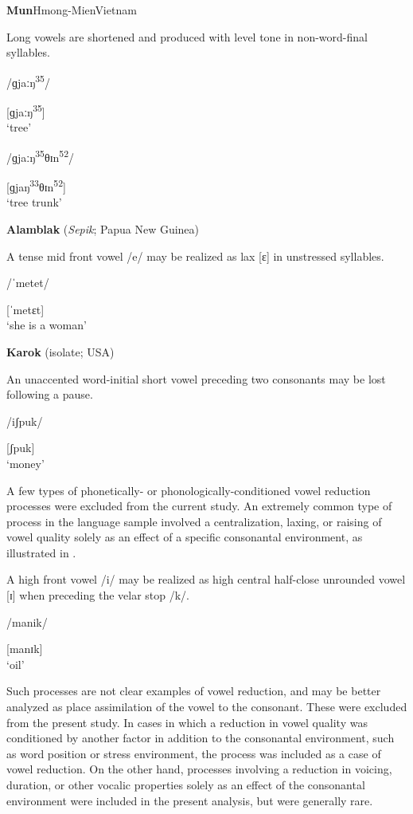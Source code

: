 \ea\label{ex:6.7}
 \textbf{Mun}{Hmong-Mien}{Vietnam}

Long vowels are shortened and produced with level tone in non-word-final syllables. 

\ea  /ɡjaːŋ\textsuperscript{35}/

[ɡjaːŋ\textsuperscript{35}]\\
\glt ‘tree’

\ex  /ɡjaːŋ\textsuperscript{35}θɪn\textsuperscript{52}/

[ɡjaŋ\textsuperscript{33}θɪn\textsuperscript{52}]\\
\glt ‘tree trunk’
\citep[117]{Clark2008}
\z
\z

\ea\label{ex:6.8}
  \textbf{Alamblak} (\textit{Sepik}; Papua New Guinea)

A tense mid front vowel /e/ may be realized as lax [ɛ] in unstressed syllables.

/ˈmetet/

[ˈmetɛt]\\
\glt ‘she is a woman’
\citep[38]{Bruce1984}
\z

\ea\label{ex:6.9}
   \textbf{Karok} (isolate; USA)

An unaccented word-initial short vowel preceding two consonants may be lost following a pause. 

/iʃpuk/

[ʃpuk]\\
\glt ‘money’
\citep[53]{Bright1957}
\z

  A few types of phonetically- or phonologically-conditioned vowel reduction processes were excluded from the current study. An extremely common type of process in the language sample involved a centralization, laxing, or raising of vowel quality solely as an effect of a specific consonantal environment, as illustrated in .

\ea\label{ex:6.10}

A high front vowel /i/ may be realized as high central half-close unrounded vowel [ɪ] when preceding the velar stop /k/.

/manik/

[manɪk]\\
\glt ‘oil’
\citep[15]{Dol2007}
\z

Such processes are not clear examples of vowel reduction, and may be better analyzed as place assimilation of the vowel to the consonant. These were excluded from the present study. In cases in which a reduction in vowel quality was conditioned by another factor in addition to the consonantal environment, such as word position or stress environment, the process was included as a case of vowel reduction. On the other hand, processes involving a reduction in voicing, duration, or other vocalic properties solely as an effect of the consonantal environment were included in the present analysis, but were generally rare.

